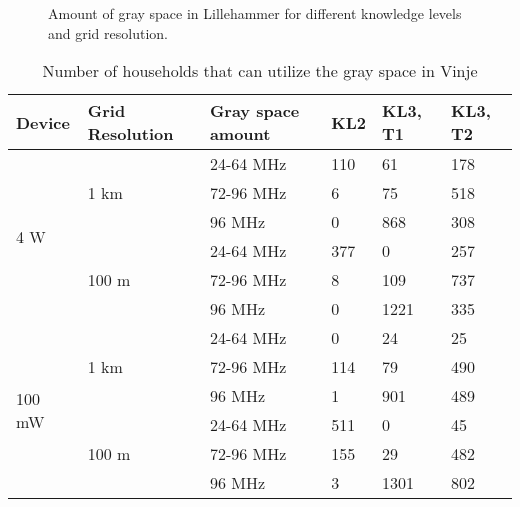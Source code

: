 \documentclass[journal,11pt,draftclsnofoot,onecolumn]{IEEEtran}
\begin{document}
\begin{figure}[t!]
\centering
{}
\caption{Amount of gray space in Lillehammer for different knowledge levels and grid resolution.}
\label{fig:gray-space-lillehammer}
\end{figure}

\begin{table*}[t!]
\centering
\caption{Number of households that can utilize the gray space in Vinje}
\begin{tabular}{|l|l|l|l|l|l|}
\hline
Device & Grid Resolution & Gray space amount & KL2 & KL3, T1 & KL3, T2 \\
\hline
\multirow{6}{*}{4 W} & \multirow{3}{*}{1 km} & 24-64 MHz & 110 & 61 & 178 \\
& & 72-96 MHz & 6 & 75 & 518 \\
& & 96 MHz  & 0 & 868 & 308 \\
\cline{2-6}
& \multirow{3}{*}{100 m} & 24-64 MHz & 377 & 0 & 257 \\
& & 72-96 MHz & 8 & 109 & 737 \\
& & 96 MHz  & 0 & 1221 & 335 \\
\hline
\multirow{6}{*}{100 mW} & \multirow{3}{*}{1 km} & 24-64 MHz & 0 & 24 & 25 \\
& & 72-96 MHz & 114 & 79 & 490 \\
& & 96 MHz  & 1 & 901 & 489 \\
\cline{2-6}
& \multirow{3}{*}{100 m} & 24-64 MHz & 511 & 0 & 45 \\
& & 72-96 MHz & 155 & 29 & 482 \\
& & 96 MHz  & 3 & 1301 & 802 \\
\hline
\end{tabular}
\label{tab:res-house}
\end{table*}
\end{document}
